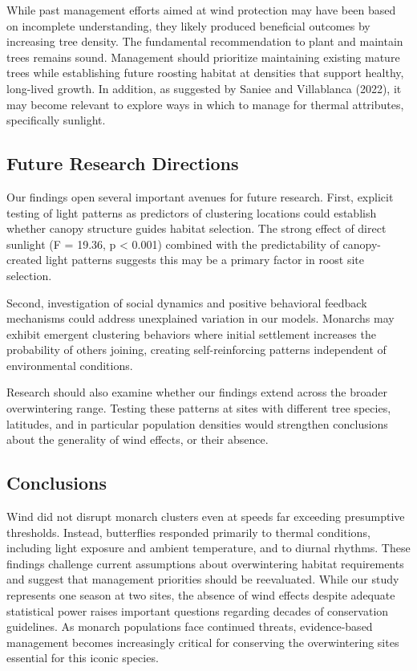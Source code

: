 While past management efforts aimed at wind protection may have been based on incomplete understanding, they likely produced beneficial outcomes by increasing tree density. The fundamental recommendation to plant and maintain trees remains sound. Management should prioritize maintaining existing mature trees while establishing future roosting habitat at densities that support healthy, long-lived growth. In addition, as suggested by Saniee and Villablanca (2022), it may become relevant to explore ways in which to manage for thermal attributes, specifically sunlight.

\subsection{Future Research Directions}

Our findings open several important avenues for future research. First, explicit testing of light patterns as predictors of clustering locations could establish whether canopy structure guides habitat selection. The strong effect of direct sunlight (F = 19.36, p < 0.001) combined with the predictability of canopy-created light patterns suggests this may be a primary factor in roost site selection.

Second, investigation of social dynamics and positive behavioral feedback mechanisms could address unexplained variation in our models. Monarchs may exhibit emergent clustering behaviors where initial settlement increases the probability of others joining, creating self-reinforcing patterns independent of environmental conditions.

Research should also examine whether our findings extend across the broader overwintering range. Testing these patterns at sites with different tree species, latitudes, and in particular population densities would strengthen conclusions about the generality of wind effects, or their absence.

\subsection{Conclusions}

Wind did not disrupt monarch clusters even at speeds far exceeding presumptive thresholds. Instead, butterflies responded primarily to thermal conditions, including light exposure and ambient temperature, and to diurnal rhythms. These findings challenge current assumptions about overwintering habitat requirements and suggest that management priorities should be reevaluated. While our study represents one season at two sites, the absence of wind effects despite adequate statistical power raises important questions regarding decades of conservation guidelines. As monarch populations face continued threats, evidence-based management becomes increasingly critical for conserving the overwintering sites essential for this iconic species.